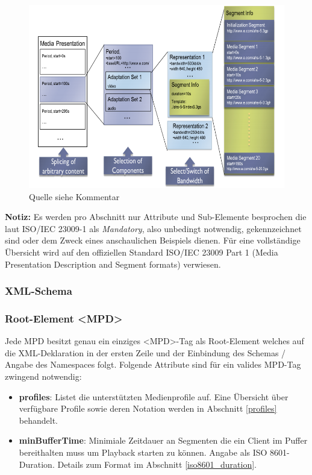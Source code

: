 \documentclass[paper = a4, fontsize = 12pt, parskip = half]{scrartcl} %
\begin{document}
\begin{center}
	\begin{figure}[h!]
		\includegraphics[width=12cm]{images/mpd-structure.png}
		\caption{Quelle siehe Kommentar}
	\end{figure}
\end{center}

\textbf{Notiz:} Es werden pro Abschnitt nur Attribute und Sub-Elemente besprochen die laut ISO/IEC 23009-1 als \textit{Mandatory}, also unbedingt notwendig, gekennzeichnet sind oder dem Zweck eines anschaulichen Beispiels dienen. Für eine vollständige Übersicht wird auf den offiziellen Standard ISO/IEC 23009 Part 1 (Media Presentation Description and Segment formats) verwiesen.

\subsubsection{XML-Schema}

\subsubsection{Root-Element <MPD>}
Jede MPD besitzt genau ein einziges <MPD>-Tag als Root-Element welches auf die XML-Deklaration in der ersten Zeile und der Einbindung des Schemas / Angabe des Namespaces folgt.
Folgende Attribute sind für ein valides MPD-Tag zwingend notwendig:

\begin{itemize}
	\item \textbf{profiles}: Listet die unterstützten Medienprofile auf. Eine Übersicht über verfügbare Profile sowie deren Notation werden in Abschnitt \ref{profiles} behandelt.
	\item \textbf{minBufferTime}: Minimiale Zeitdauer an Segmenten die ein Client im Puffer bereithalten muss um Playback starten zu können. Angabe als ISO 8601-Duration. Details zum Format im Abschnitt \ref{iso8601_duration}.
\end{itemize}
\end{document}

